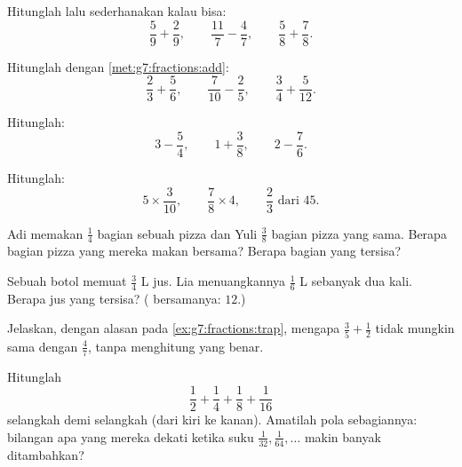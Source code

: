 \begin{exercise}[$\star$]\label{exo:g7:fractions:5}
Hitunglah lalu sederhanakan kalau bisa:
\[
\frac{5}{9} + \frac{2}{9}, \qquad
\frac{11}{7} - \frac{4}{7}, \qquad
\frac{5}{8} + \frac{7}{8} .
\]
\end{exercise}

\begin{exercise}[$\star$]\label{exo:g7:fractions:6}
Hitunglah dengan \cref{met:g7:fractions:add}:
\[
\frac{2}{3} + \frac{5}{6}, \qquad
\frac{7}{10} - \frac{2}{5}, \qquad
\frac{3}{4} + \frac{5}{12} .
\]
\end{exercise}

\begin{exercise}[$\star$]\label{exo:g7:fractions:7}
Hitunglah:
\[
3 - \frac{5}{4}, \qquad
1 + \frac{3}{8}, \qquad
2 - \frac{7}{6} .
\]
\end{exercise}

\begin{exercise}[$\star$]\label{exo:g7:fractions:8}
Hitunglah:
\[
5 \times \frac{3}{10}, \qquad
\frac{7}{8} \times 4, \qquad
\frac{2}{3} \text{ dari } 45 .
\]
\end{exercise}

\begin{exercise}[$\star\star$]\label{exo:g7:fractions:9}
Adi memakan $\frac14$ bagian sebuah pizza dan Yuli $\frac38$ bagian
pizza yang sama. Berapa bagian pizza yang mereka makan bersama?
Berapa bagian yang tersisa?
\end{exercise}

\begin{exercise}[$\star\star$]\label{exo:g7:fractions:10}
Sebuah botol memuat $\frac34$ L jus. Lia menuangkannya $\frac16$ L
sebanyak dua kali. Berapa jus yang tersisa? ( bersamanya: $12$.)
\end{exercise}

\begin{exercise}[$\star\star$]\label{exo:g7:fractions:11}
Jelaskan, dengan alasan pada \cref{ex:g7:fractions:trap}, mengapa
$\frac35 + \frac12$ tidak mungkin sama dengan $\frac{4}{7}$, tanpa
menghitung  yang benar.
\end{exercise}

\begin{exercise}[$\star\star\star$]\label{exo:g7:fractions:12}
Hitunglah 
\[
\frac12 + \frac14 + \frac18 + \frac{1}{16}
\]
selangkah demi selangkah (dari kiri ke kanan). Amatilah pola 
sebagiannya: bilangan apa yang mereka dekati ketika suku
$\frac{1}{32}, \frac{1}{64}, \dots$ makin banyak ditambahkan?
\end{exercise}


